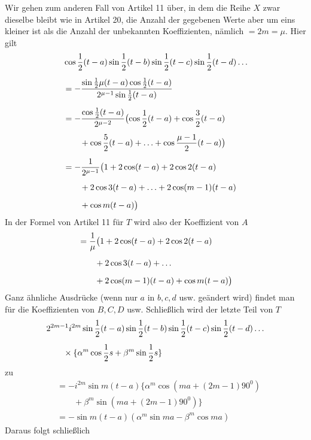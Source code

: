 \begingroup
\renewcommand{\arraystretch}{1.45}
Wir gehen zum anderen Fall von Artikel 11 über, in dem die Reihe \(X\) zwar dieselbe bleibt wie in Artikel 20, die Anzahl der gegebenen Werte aber um eins kleiner ist als
die Anzahl der unbekannten Koeffizienten, nämlich \(=2m=\mu\). Hier gilt
\[
\begin{aligned}
&\cos\frac12(t-a)\sin\frac12(t-b)\sin\frac12(t-c)\sin\frac12(t-d)\mathinner{.\,.\,.}\\[5pt]
&=-\frac{\sin\frac12\mu(t-a)\cos\frac12(t-a)}{2^{\mu-1}\sin\frac12(t-a)}\\[5pt]
&=-\frac{\cos\frac12(t-a)}{2^{\mu-2}}\bigl(\cos\frac12(t-a)+\cos\frac32(t-a)\\[5pt]&\qquad{}+\cos\frac52(t-a)+\mathinner{.\,.\,.}+\cos\frac{\mu-1}{2}(t-a)\bigr)\\[5pt]
&=-\frac{1}{2^{\mu-1}}\bigl(1+2\cos(t-a)+2\cos2(t-a)\\[5pt]&\qquad{}+2\cos3(t-a)+\mathinner{.\,.\,.}+2\cos(m-1)(t-a)\\[5pt]
&\qquad +\cos m(t-a)\bigr)
\end{aligned}
\]
In der Formel von Artikel 11 für $T$ wird also der Koeffizient von $A$
\[
\begin{aligned}
&=\frac1\mu\bigl(1+2\cos(t-a)+2\cos2(t-a)\\[5pt]&\qquad{}+2\cos3(t-a)+\mathinner{.\,.\,.}\\[5pt]
&\qquad +2\cos(m-1)(t-a)+\cos m(t-a)\bigr)
\end{aligned}
\]
Ganz ähnliche Ausdrücke (wenn nur $a$ in $b,c,d$ usw. geändert wird) findet man für die Koeffizienten von $B,C,D$ usw. Schließlich wird der letzte Teil von $T$
\[
\begin{aligned}
&2^{2m-1}i^{2m}\sin\frac12(t-a)\sin\frac12(t-b)\sin\frac12(t-c)\sin\frac12(t-d)\mathinner{.\,.\,.}\\[5pt]&\qquad\times\{\alpha^m\cos\frac12s+\beta^m\sin\frac12s\}
\end{aligned}
\]
zu
\[
\begin{aligned}
&=-i^{2m}\sin m(t-a)\{\alpha^m\cos(ma+(2m-1)90^{0})\\[5pt]&\qquad{}+\beta^m\sin(ma+(2m-1)90^{0})\}\\[5pt]
&=-\sin m(t-a)(\alpha^m\sin ma-\beta^m\cos ma)
\end{aligned}
\]
Daraus folgt schließlich
